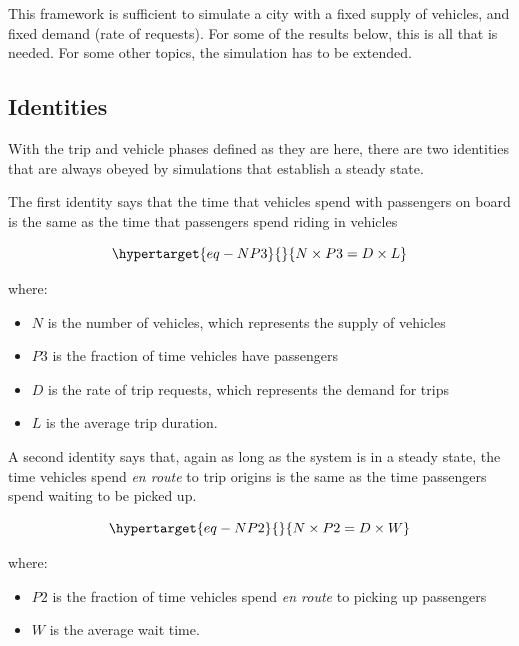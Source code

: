 \documentclass[
  letterpaper,
  DIV=11,
  numbers=noendperiod]{scrartcl}
\begin{document}
This framework is sufficient to simulate a city with a fixed supply of
vehicles, and fixed demand (rate of requests). For some of the results
below, this is all that is needed. For some other topics, the simulation
has to be extended.

\hypertarget{identities}{%
\subsection{Identities}\label{identities}}

With the trip and vehicle phases defined as they are here, there are two
identities that are always obeyed by simulations that establish a steady
state.

The first identity says that the time that vehicles spend with
passengers on board is the same as the time that passengers spend riding
in vehicles

\begin{equation}\protect\hypertarget{eq-NP3}{}{
N \times P3 = D \times L
}\label{eq-NP3}\end{equation}

where:

\begin{itemize}
\item
  \(N\) is the number of vehicles, which represents the supply of
  vehicles
\item
  \(P3\) is the fraction of time vehicles have passengers
\item
  \(D\) is the rate of trip requests, which represents the demand for
  trips
\item
  \(L\) is the average trip duration.
\end{itemize}

A second identity says that, again as long as the system is in a steady
state, the time vehicles spend \emph{en route} to trip origins is the
same as the time passengers spend waiting to be picked up.

\begin{equation}\protect\hypertarget{eq-NP2}{}{
N \times P2 = D \times W
}\label{eq-NP2}\end{equation}

where:

\begin{itemize}
\item
  \(P2\) is the fraction of time vehicles spend \emph{en route} to
  picking up passengers
\item
  \(W\) is the average wait time.
\end{itemize}
\end{document}
